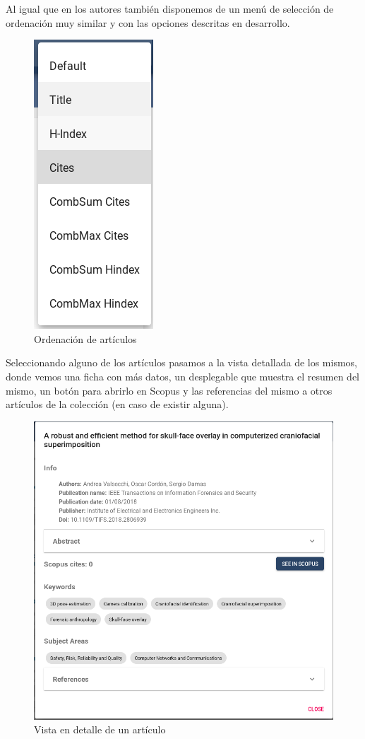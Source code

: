 \newpage
Al igual que en los autores también disponemos de un menú de selección de ordenación muy similar y con las opciones descritas en desarrollo.

\begin{figure}[h]
	
	\centering
	\includegraphics[width=0.20\linewidth]{imagenes/UIAbstractSelection}
	\caption{Ordenación de artículos}
	
\end{figure}

\newpage
Seleccionando alguno de los artículos pasamos a la vista detallada de los mismos, donde vemos una ficha con más datos, un desplegable que muestra el resumen del mismo, un botón para abrirlo en Scopus y las referencias del mismo a otros artículos de la colección (en caso de existir alguna).

\begin{figure}[h]
	\centering
	\includegraphics[width=\linewidth]{imagenes/UIAbstractDetail}
	\caption{Vista en detalle de un artículo}
	\vspace{-30pt}
\end{figure}